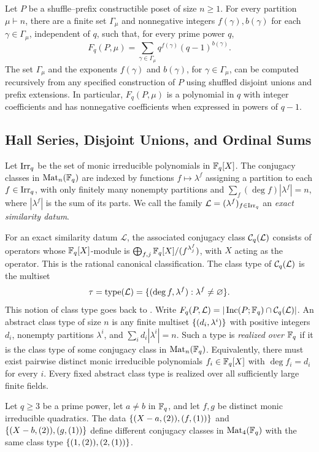 \begin{theorem}
\label{thm:main}
{Let $P$ be a shuffle--prefix constructible poset of
size $n\geq1$. For every partition $\mu\vdash n$, there are a finite set
$\Gamma_\mu$ and nonnegative integers $f(\gamma), b(\gamma)$ for each $\gamma\in\Gamma_\mu$, independent
of $q$, such that, for every prime power $q$,}
\begin{equation}
 F_q(P,\mu)=\sum_{\gamma\in\Gamma_\mu}
             q^{f(\gamma)}(q-1)^{b(\gamma)}.
 \label{eq:history-formula}
\end{equation}
{The set $\Gamma_\mu$ and the exponents $f(\gamma)$ and $b(\gamma)$,
for $\gamma\in\Gamma_\mu$, can be computed recursively
from any specified construction of $P$ using shuffled disjoint unions
and prefix extensions. In particular, $F_q(P,\mu)$ is a polynomial in $q$
with integer coefficients and has nonnegative coefficients when expressed
in powers of $q-1$.}
\end{theorem}

\subsection{Hall Series, Disjoint Unions, and Ordinal Sums}
\label{sec:hall-series-introduction}
{Let $\operatorname{Irr}_q$ be the set of monic irreducible
polynomials in $\mathbb F_q[X]$. The conjugacy classes in $\operatorname{Mat}_n(\mathbb F_q)$ are
indexed by functions $f\mapsto\lambda^f$ assigning a partition to each
$f\in\operatorname{Irr}_q$, with only finitely many nonempty partitions and
$\sum_f(\deg f)|\lambda^f|=n$, where $|\lambda^f|$ is the sum of its
parts. We call the family $\mathcal L=(\lambda^f)_{f\in\operatorname{Irr}_q}$ an
\emph{exact similarity datum}.}

{
For an exact similarity datum $\mathcal L$, the associated conjugacy class
$\mathcal C_q(\mathcal L)$ consists of operators whose $\mathbb F_q[X]$-module is
$\bigoplus_{f,j}\mathbb F_q[X]/(f^{\lambda^f_j})$, with $X$ acting as the operator.
This is the rational canonical classification. The class type of
$\mathcal C_q(\mathcal L)$ is the
multiset
\[
 \tau=\operatorname{type}(\mathcal L)=\{(\deg f,\lambda^f):\lambda^f\ne\varnothing\}.
\]
This notion of class type goes back to \textcite{Green1955}.
Write
$F_q(P,\mathcal L)=|\operatorname{Inc}(P;\mathbb F_q)\cap\mathcal C_q(\mathcal L)|$.
An abstract class type of size $n$ is any finite multiset
$\{(d_i,\lambda^i)\}$ with {positive integers $d_i$}, nonempty partitions
$\lambda^i$, and $\sum_i d_i|\lambda^i|=n$. Such a type is
\emph{realized over $\mathbb F_q$} if it is the class type of some conjugacy class
in $\operatorname{Mat}_n(\mathbb F_q)$. Equivalently, there must exist pairwise distinct monic
irreducible polynomials $f_i\in\mathbb F_q[X]$ with $\deg f_i=d_i$ for every $i$.
Every fixed abstract class type is realized over all sufficiently large
finite fields.

\begin{example}
\label{ex:class-type}
Let $q\geq3$ be a prime power, let $a\ne b$ in $\mathbb F_q$, and let $f,g$
be distinct monic irreducible quadratics. The data
$\{(X-a,(2)),(f,(1))\}$ and
$\{(X-b,(2)),(g,(1))\}$ define different conjugacy classes in $\operatorname{Mat}_4(\mathbb F_q)$
with the same class type $\{(1,(2)),(2,(1))\}$.
\end{example}
}


